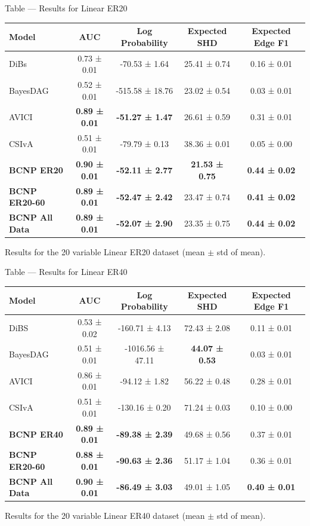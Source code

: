 \documentclass[aspectratio=169,10pt]{beamer}
\begin{document}
\begin{frame}{Table --- Results for Linear ER20}
\centering
\scriptsize
\begin{tabular}{lcccc}
\toprule
\textbf{Model} & \textbf{AUC} & \textbf{Log Probability} & \textbf{Expected SHD} & \textbf{Expected Edge F1} \\
\midrule
DiBs & 0.73 ± 0.01 & -70.53 ± 1.64 & 25.41 ± 0.74 & 0.16 ± 0.01 \\
BayesDAG & 0.52 ± 0.01 & -515.58 ± 18.76 & 23.02 ± 0.54 & 0.03 ± 0.01 \\
AVICI & \textbf{0.89 ± 0.01} & \textbf{-51.27 ± 1.47} & 26.61 ± 0.59 & 0.31 ± 0.01 \\
CSIvA & 0.51 ± 0.01 & -79.79 ± 0.13 & 38.36 ± 0.01 & 0.05 ± 0.00 \\
\textbf{BCNP ER20} & \textbf{0.90 ± 0.01} & \textbf{-52.11 ± 2.77} & \textbf{21.53 ± 0.75} & \textbf{0.44 ± 0.02} \\
\textbf{BCNP ER20-60} & \textbf{0.89 ± 0.01} & \textbf{-52.47 ± 2.42} & 23.47 ± 0.74 & \textbf{0.41 ± 0.02} \\
\textbf{BCNP All Data} & \textbf{0.89 ± 0.01} & \textbf{-52.07 ± 2.90} & 23.35 ± 0.75 & \textbf{0.44 ± 0.02}\\
\bottomrule
\end{tabular}

\vspace{0.3cm}
{\footnotesize Results for the 20 variable Linear ER20 dataset (mean $\pm$ std of mean).}
\end{frame}

\begin{frame}{Table --- Results for Linear ER40}
\centering
\scriptsize
\begin{tabular}{lcccc}
\toprule
\textbf{Model} & \textbf{AUC} & \textbf{Log Probability} & \textbf{Expected SHD} & \textbf{Expected Edge F1} \\
\midrule
DiBS & 0.53 ± 0.02 & -160.71 ± 4.13 & 72.43 ± 2.08 & 0.11 ± 0.01 \\
BayesDAG & 0.51 ± 0.01 & -1016.56 ± 47.11 & \textbf{44.07 ± 0.53} & 0.03 ± 0.01 \\
AVICI & 0.86 ± 0.01 & -94.12 ± 1.82 & 56.22 ± 0.48 & 0.28 ± 0.01 \\
CSIvA & 0.51 ± 0.01 & -130.16 ± 0.20 & 71.24 ± 0.03 & 0.10 ± 0.00 \\
\textbf{BCNP ER40} & \textbf{0.89 ± 0.01} & \textbf{-89.38 ± 2.39} & 49.68 ± 0.56 & 0.37 ± 0.01 \\
\textbf{BCNP ER20-60} & \textbf{0.88 ± 0.01} & \textbf{-90.63 ± 2.36} & 51.17 ± 1.04 & 0.36 ± 0.01 \\
\textbf{BCNP All Data} & \textbf{0.90 ± 0.01} & \textbf{-86.49 ± 3.03} & 49.01 ± 1.05 & \textbf{0.40 ± 0.01} \\
\bottomrule
\end{tabular}

\vspace{0.3cm}
{\footnotesize Results for the 20 variable Linear ER40 dataset (mean $\pm$ std of mean).}
\end{frame}
\end{document}
